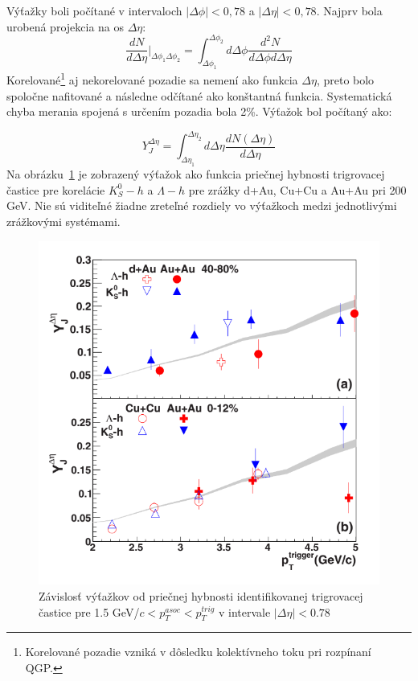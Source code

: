 \documentclass[thesismargins, thesislinespacing]{rnthesis}
\begin{document}
Výťažky boli počítané v intervaloch $|\Delta\phi|<0,78$ a $|\Delta\eta|<0,78$. Najprv bola urobená projekcia na os $\Delta\eta$:
\begin{equation}
\frac{dN}{d\Delta\eta}|_{\Delta\phi_1 \Delta\phi_2}= \int_{\Delta\phi_1}^{\Delta\phi_2}d\Delta\phi \frac{d^2N}{d\Delta \phi d\Delta \eta}
\end{equation}
Korelované\footnote{Korelované pozadie vzniká v dôsledku kolektívneho toku pri rozpínaní QGP.} aj nekorelované pozadie sa nemení ako funkcia $\Delta \eta$, preto bolo spoločne nafitované a následne odčítané ako konštantná funkcia. Systematická chyba merania spojená s určením pozadia bola 2\%. Výťažok bol počítaný ako:

\begin{equation}
Y^{\Delta\eta}_J=\int_{\Delta\eta_1}^{\Delta\eta_2}d\Delta\eta \frac{dN(\Delta\eta)}{d\Delta\eta}
\end{equation}
Na obrázku~\ref{clanokstar} je zobrazený výťažok ako funkcia priečnej hybnosti trigrovacej častice pre korelácie $K_S^0 - h$ a $\Lambda-h$ pre zrážky d+Au, Cu+Cu a Au+Au pri 200 GeV. Nie sú viditeľné žiadne zreteľné rozdiely vo výťažkoch medzi jednotlivými zrážkovými systémami. 

\begin{figure}[hbtp!]
	\centering
	\includegraphics[scale=0.5]{./Obrazky_praca/clanokstar.png}
	\caption{Závislosť výťažkov od priečnej hybnosti identifikovanej trigrovacej častice pre 1.5 GeV/$c <p_T^{asoc}<p_T^{trig}$ v intervale $|\Delta\eta|<0.78$ ~\cite{clanokstar}}
	\label{clanokstar}
\end{figure}
\end{document}
